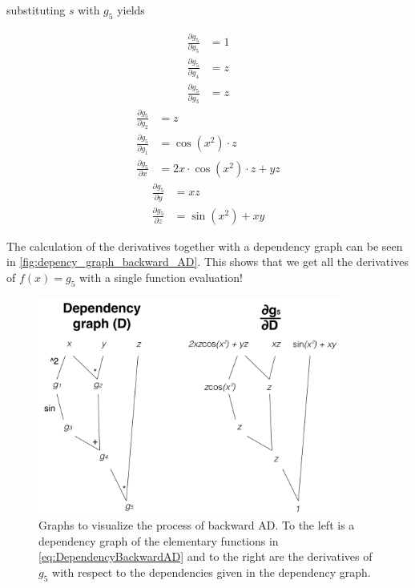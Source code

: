 substituting $s$ with $g_5$ yields
\begin{multicols}{3}
    \noindent
    \begin{align*}
        \frac{\partial g_5}{\partial g_5} &= 1\\
        \frac{\partial g_5}{\partial g_4} &= z\\
        \frac{\partial g_5}{\partial g_3} &= z
    \end{align*}
    \begin{align*}
        \frac{\partial g_5}{\partial g_2} &= z\\
        \frac{\partial g_5}{\partial g_1} &= \cos(x^2)\cdot z\\
        \frac{\partial g_5}{\partial x}   &= 2x\cdot\cos(x^2)\cdot z + yz
    \end{align*}
    \begin{align*}
        \frac{\partial g_5}{\partial y}   &= xz\\
        \frac{\partial g_5}{\partial z}   &= \sin(x^2)+xy
    \end{align*}
\end{multicols}
The calculation of the derivatives together with a dependency graph can be seen in \autoref{fig:depency_graph_backward_AD}. This shows that we get all the derivatives of $f(x) = g_5$ with a single function evaluation!
\begin{figure}[H]
	\centering
	    \includegraphics[width = 0.9\textwidth]{figures/dependency_graph_backward_AD.pdf}
 	    \caption{Graphs to visualize the process of backward AD. To the left is a dependency graph of the elementary functions in \eqref{eq:DependencyBackwardAD} and to the right are the derivatives of $g_5$ with respect to the dependencies given in the dependency graph.}
	\label{fig:depency_graph_backward_AD}
\end{figure}
